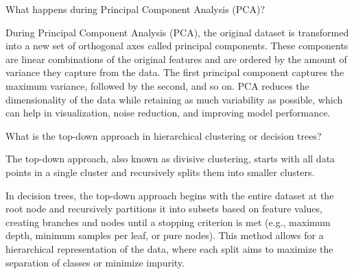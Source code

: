 \documentclass[12pt]{article}
\begin{document}
    \begin{ejercicio}
        What happens during Principal Component Analysis (PCA)?

        During Principal Component Analysis (PCA), the original dataset is transformed into a new set of orthogonal axes called principal components. These components are linear combinations of the original features and are ordered by the amount of variance they capture from the data. The first principal component captures the maximum variance, followed by the second, and so on. PCA reduces the dimensionality of the data while retaining as much variability as possible, which can help in visualization, noise reduction, and improving model performance.
    \end{ejercicio}

    \begin{ejercicio}
        What is the top-down approach in hierarchical clustering or decision trees?

        The top-down approach, also known as divisive clustering, starts with all data points in a single cluster and recursively splits them into smaller clusters.

        In decision trees, the top-down approach begins with the entire dataset at the root node and recursively partitions it into subsets based on feature values, creating branches and nodes until a stopping criterion is met (e.g., maximum depth, minimum samples per leaf, or pure nodes). This method allows for a hierarchical representation of the data, where each split aims to maximize the separation of classes or minimize impurity.
    \end{ejercicio}
\end{document}
